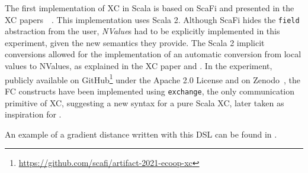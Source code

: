 The first implementation of \ac{XC} in Scala is based on ScaFi and presented in the \ac{XC} papers~\cite{xc}~\cite{xc-experiment-with-scafi}.
%
This implementation uses Scala 2.
%
Although ScaFi hides the \texttt{field} abstraction from the user, \textit{NValue}s had to be explicitly implemented in this experiment, given the new semantics they provide.
%
The Scala 2 implicit conversions allowed for the implementation of an automatic conversion from local values to NValues, as explained in the \ac{XC} paper and .
%
In the experiment, publicly available on GitHub\footnote{\url{https://github.com/scafi/artifact-2021-ecoop-xc}} under the Apache 2.0 License and on Zenodo~\cite{xc-experiment-with-scafi-code}, the \ac{FC} constructs have been implemented using \texttt{exchange}, the only communication primitive of \ac{XC}, suggesting a new syntax for a pure Scala \ac{XC}, later taken as inspiration for \this.

An example of a gradient distance written with this DSL can be found in .


